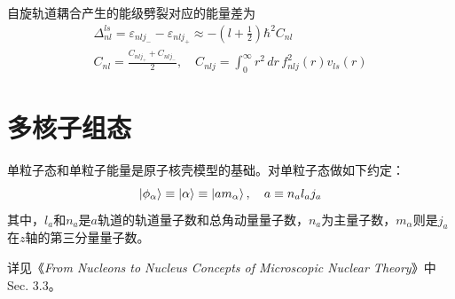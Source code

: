 自旋轨道耦合产生的能级劈裂对应的能量差为
\begin{align}
	\Delta_{nl}^{ls} = \varepsilon_{nlj_{-}} - \varepsilon_{nlj_{+}} \approx -(l + \frac{1}{2})\hbar^2 C_{nl} \\
	C_{nl} = \frac{C_{nlj_{+}} + C_{nlj_{-}}}{2},
	\quad
	C_{nlj} = \int_{0}^{\infty} r^2\, dr\, f_{nlj}^2(r) v_{ls}(r)
\end{align}

\section{多核子组态}
单粒子态和单粒子能量是原子核壳模型的基础。对单粒子态做如下约定：
\begin{equation}
	\ket{\phi_{\alpha}} \equiv \ket{\alpha} \equiv \ket{am_{\alpha}}, \quad a \equiv n_{a} l_{a} j_{a} \label{eq:sgl-part-stat}
\end{equation}
其中，$l_a$和$n_a$是$a$轨道的轨道量子数和总角动量量子数，$n_a$为主量子数，$m_{\alpha}$则是$j_a$在$z$轴的第三分量量子数。

详见《\textit{From Nucleons to Nucleus Concepts of Microscopic Nuclear Theory}》中Sec. 3.3。
